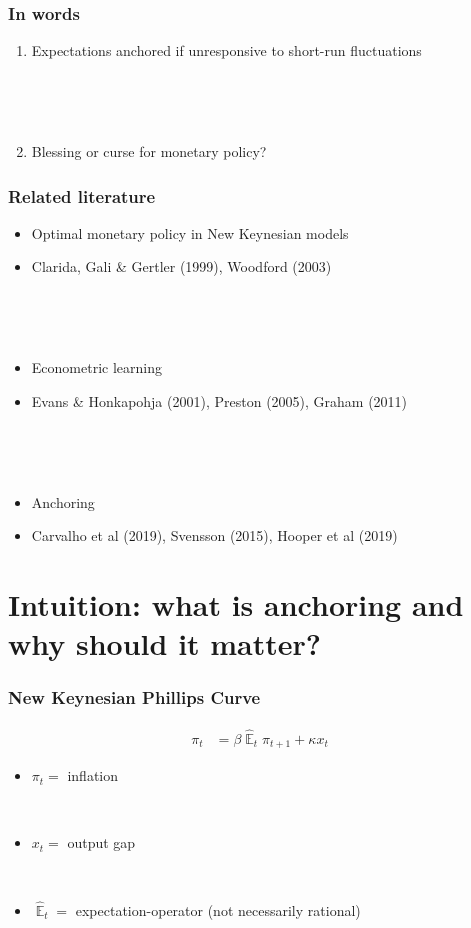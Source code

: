 \documentclass{beamer}
\DeclareMathOperator{\E}{\mathbb{E}}
\begin{document}
\begin{frame}
	\frametitle{In words}
	
	\begin{enumerate}
	\item Expectations anchored if unresponsive to short-run fluctuations
	
	\
	
	\
	
	\item Blessing or curse for monetary policy?

	\end{enumerate}


\end{frame}


\begin{frame}
	\frametitle{Related literature}

\begin{itemize}
\item Optimal monetary policy in New Keynesian models
\item[] Clarida, Gali \& Gertler (1999), Woodford (2003)

\

\

\item Econometric learning
\item[] Evans \& Honkapohja (2001), Preston (2005), Graham (2011)

\

\

\item Anchoring
\item[] Carvalho et al (2019), Svensson (2015), Hooper et al (2019)
\end{itemize}



\end{frame}

\section{Intuition: what is anchoring and why should it matter?}
\begin{frame}
	\frametitle{New Keynesian Phillips Curve}

\begin{align*}
\pi_t & = \beta \hat{\E}_t\pi_{t+1} + \kappa x_t
\end{align*}

\begin{itemize}
\item $\pi_t = $ inflation

\

\item $x_t =$ output gap

\

\item $\hat{\E}_t =$ expectation-operator (not necessarily rational)


\end{itemize}



\end{frame}
\end{document}
